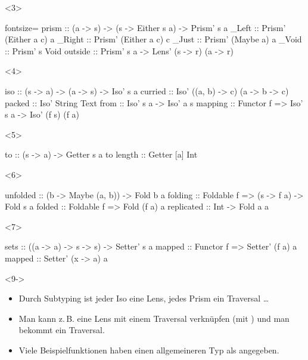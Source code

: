 \documentclass{beamer}
\begin{document}
\begin{frame}[t,fragile]
  \begin{onlyenv}<3>
\begin{haskellcode*}{fontsize=\small}
prism :: (a -> s) -> (s -> Either s a) -> Prism' s a
_Left :: Prism' (Either a c) a    _Right :: Prism' (Either a c) c
_Just :: Prism' (Maybe a) a
_Void :: Prism' s Void
outside :: Prism' s a -> Lens' (s -> r) (a -> r)
\end{haskellcode*}
  \end{onlyenv}

  \begin{onlyenv}<4>
\begin{haskellcode}
iso :: (s -> a) -> (a -> s) -> Iso' s a
curried :: Iso' ((a, b) -> c) (a -> b -> c)
packed :: Iso' String Text
from :: Iso' s a -> Iso' a s
mapping :: Functor f => Iso' s a -> Iso' (f s) (f a)
\end{haskellcode}
  \end{onlyenv}

  \begin{onlyenv}<5>
\begin{haskellcode}
to :: (s -> a) -> Getter s a
to length :: Getter [a] Int
\end{haskellcode}
  \end{onlyenv}

  \begin{onlyenv}<6>
\begin{haskellcode}
unfolded :: (b -> Maybe (a, b)) -> Fold b a
folding :: Foldable f => (s -> f a) -> Fold s a
folded  :: Foldable f => Fold (f a) a
replicated :: Int -> Fold a a
\end{haskellcode}
  \end{onlyenv}

  \begin{onlyenv}<7>
\begin{haskellcode}
sets :: ((a -> a) -> s -> s) -> Setter' s a
mapped :: Functor f => Setter' (f a) a
mapped :: Setter' (x -> a) a
\end{haskellcode}
  \end{onlyenv}

  {\small
  \begin{onlyenv}<9->
    \begin{itemize}
      \item<9-> Durch Subtyping ist jeder Iso eine Lens, jedes Prism ein Traversal \ldots
      \item<10-> Man kann z.\,B. eine Lens mit einem Traversal verknüpfen (mit ) und man bekommt ein Traversal.
      \item<11-> Viele Beispielfunktionen haben einen allgemeineren Typ als angegeben.
    \end{itemize}
  \end{onlyenv}}


\end{frame}
\end{document}

